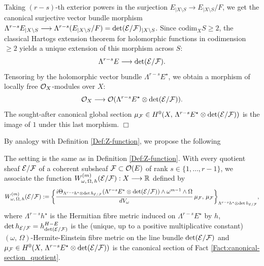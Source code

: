 \documentclass[12pt]{article}
\begin{document}
  Taking $(r-s)$-th exterior powers in the surjection $E_{|X\setminus S}\longrightarrow E_{|X\setminus S}/F$, we get the canonical surjective vector bundle morphism $\Lambda^{r-s}E_{|X\setminus S}\longrightarrow\Lambda^{r-s}(E_{|X\setminus S}/F) = \det({\cal E}/{\cal F})_{|X\setminus S}$. Since $\mbox{codim}_X S\geq 2$, the classical Hartogs extension theorem for holomorphic functions in codimension $\geq 2$ yields a unique extension of this morphism across $S$: \begin{eqnarray*}\Lambda^{r-s}E\longrightarrow\det({\cal E}/{\cal F}).\end{eqnarray*} Tensoring by the holomorphic vector bundle $\Lambda^{r-s}E^\star$, we obtain a morphism of locally free ${\cal O}_X$-modules over $X$: \begin{eqnarray*}{\cal O}_X\longrightarrow{\cal O}(\Lambda^{r-s}E^\star\otimes\det({\cal E}/{\cal F})).\end{eqnarray*} The sought-after canonical global section $\mu_{{\cal F}}\in H^0(X,\,\Lambda^{r-s} E^\star\otimes\det({\cal E}/{\cal F}))$ is the image of $1$ under this last morphism. \hfill $\Box$


  \vspace{2ex}

  By analogy with Definition \ref{Def:Z-function}, we propose the following

  \begin{Def}\label{Def:Q-function} The setting is the same as in Definition \ref{Def:Z-function}. With every quotient sheaf ${\cal E}/{\cal F}$ of a coherent subsheaf ${\cal F}\subset{\cal O}(E)$ of rank $s\in\{1,\dots , r-1\}$, we associate the function
  $W_{\omega,\,\Omega,\,h}^{(m)}({\cal E}/{\cal F}):X\longrightarrow\mathbb{R}$ defined by \begin{eqnarray*}W_{\omega,\,\Omega,\,h}^{(m)}({\cal E}/{\cal F}):=\bigg\{\frac{i\Theta_{\Lambda^{r-s}h^\star\otimes\det h_{{\cal E}/{\cal F}}}(\Lambda^{r-s} E^\star\otimes\det({\cal E}/{\cal F}))\wedge\omega^{m-1}\wedge\Omega}{dV_\omega}\,\mu_{{\cal F}},\,\mu_{{\cal F}}\bigg\}_{\Lambda^{r-s}h^\star\otimes\det h_{{\cal E}/{\cal F}}},\end{eqnarray*} where $\Lambda^{r-s}h^\star$ is the Hermitian fibre metric induced on $\Lambda^{r-s} E^\star$ by $h$, $\det h_{{\cal E}/{\cal F}} = h^{H-E}_{\det({\cal E}/{\cal F})}$ is the (unique, up to a positive multiplicative constant) $(\omega,\,\Omega)$-Hermite-Einstein fibre metric on the line bundle $\det({\cal E}/{\cal F})$ and $\mu_{{\cal F}}\in H^0(X,\,\Lambda^{r-s} E^\star\otimes\det({\cal E}/{\cal F}))$ is the canonical section of Fact \ref{Fact:canonical-section_quotient}.


\end{Def}
\end{document}
